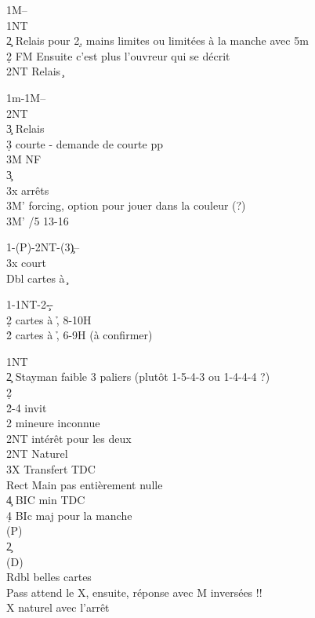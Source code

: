 \documentclass[a4paper]{article}
\begin{document}
\begin{bidtable}
1M--\+\\
1NT\\
2\c \> Relais pour 2\d , mains limites ou limitées à la manche avec 5m\\
2\d \> FM Ensuite c'est plus l'ouvreur qui se décrit\\
2NT \> Relais \c \-
\end{bidtable}

\begin{bidtable}
1m-1M--\+\\
2NT\+\\
3\c \> Relais\\
3\d \> courte - demande de courte pp\\
3M \> NF\-\\
3\c\+\\
3x \> arrêts\\
3M' \> forcing, option pour jouer dans la couleur (?)\-\\
3M' /5 13-16\-
\end{bidtable}

\begin{bidtable}
1\s-(P)-2NT-(3\c)--\+\\
3x \> court \c \\
Dbl  cartes à \c \-
\end{bidtable}

\begin{bidtable}
1\s-1NT-2\c--\+\\
2\d {} cartes à \h , 8-10H\\
2\h {} cartes à \h , 6-9H (à confirmer)\-
\end{bidtable}

\begin{bidtable}
1NT\+\\
2\c \> Stayman faible 3 paliers (plutôt 1-5-4-3 ou 1-4-4-4 ?)\+\\
2\d\+\\
2\h\s {}-4 invit\-\-\\
2\s \> mineure inconnue\+\\
2NT \> intérêt pour les deux\-\\
2NT \> Naturel\\
3X \> Transfert TDC\+\\
Rect \> Main pas entièrement nulle\-\\
4\c \> BIC min TDC\\
4\d \> BIc maj pour la manche\\
(P)\+\\
2\c\+\\
(D)\+\\
Rdbl  belles cartes\\
Pass \> attend le X, ensuite, réponse avec M inversées !!\\
X \> naturel avec l'arrêt\-\-\-\-
\end{bidtable}
\end{document}
